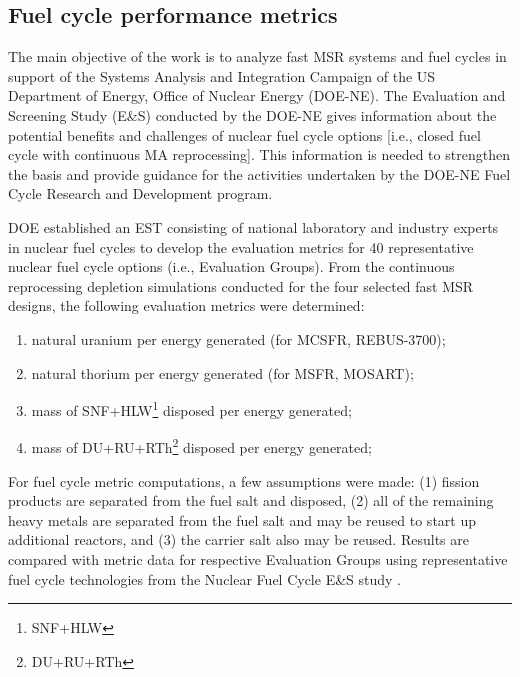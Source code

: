 \documentclass[letterpaper]{mandc2019}
\begin{document}
\subsection{Fuel cycle performance metrics}
\label{sec:performance}
The main objective of the work is to analyze fast \gls{MSR} systems and fuel cycles in support of the Systems Analysis and Integration Campaign of the US Department of Energy, Office of Nuclear Energy (DOE-NE). The Evaluation and Screening Study (E\&S) conducted by the DOE-NE gives information about the potential benefits and challenges of nuclear fuel cycle options [i.e., closed fuel cycle with continuous \gls{MA} reprocessing]. This information is needed to strengthen the basis and provide guidance for the activities undertaken by the DOE-NE Fuel Cycle Research and Development program.

DOE established an \gls{EST} consisting of national laboratory and industry experts in nuclear fuel cycles to develop the evaluation metrics for 40 representative nuclear fuel cycle options (i.e., Evaluation Groups). From the continuous reprocessing depletion simulations conducted for the four selected fast \gls{MSR} designs, the following evaluation metrics were determined:
\vspace{-0.4in}
\begin{enumerate}
	\item natural uranium per energy generated (for \gls{MCSFR}, REBUS-3700);\vspace{-0.11in}
	\item natural thorium per energy generated (for \gls{MSFR}, \gls{MOSART});\vspace{-0.11in}
	\item mass of SNF+HLW\footnote{\gls{SNF}+\gls{HLW}} disposed per energy generated;\vspace{-0.11in}
	\item mass of DU+RU+RTh\footnote{\gls{DU}+\gls{RU}+\gls{RTh}} disposed per energy  generated;\vspace{-0.18in}
\end{enumerate}
For fuel cycle metric computations, a few assumptions were made:
(1) fission products are separated from the fuel salt and disposed,
(2) all of the remaining heavy metals are separated from the fuel salt and may be reused to start up additional reactors, and
(3) the carrier salt also may be reused.
Results are compared with metric data for respective Evaluation Groups using representative fuel cycle technologies from the Nuclear Fuel Cycle E\&S study \cite{wigeland_nuclear_2014-4}.
\end{document}
